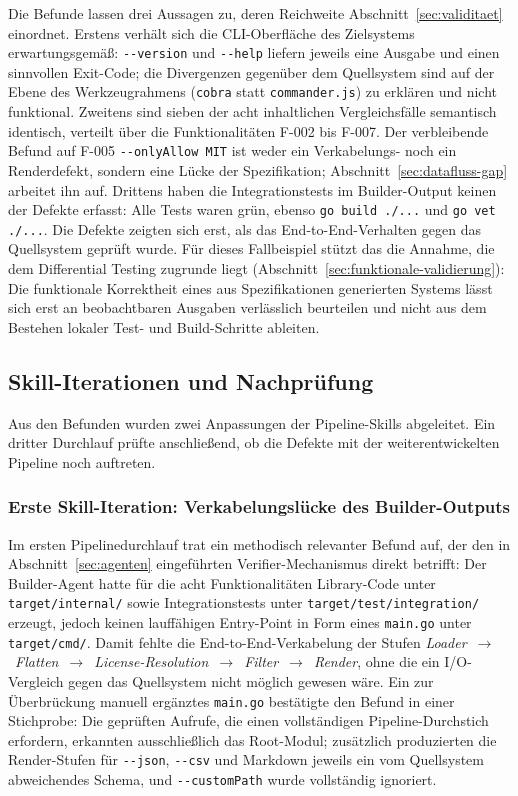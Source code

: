 Die Befunde lassen drei Aussagen zu, deren Reichweite Abschnitt~\ref{sec:validitaet} einordnet. Erstens verhält sich die CLI-Oberfläche des Zielsystems erwartungsgemäß: \texttt{-{}-version} und \texttt{-{}-help} liefern jeweils eine Ausgabe und einen sinnvollen Exit-Code; die Divergenzen gegenüber dem Quellsystem sind auf der Ebene des Werkzeugrahmens (\texttt{cobra} statt \texttt{commander.js}) zu erklären und nicht funktional. Zweitens sind sieben der acht inhaltlichen Vergleichsfälle semantisch identisch, verteilt über die Funktionalitäten F-002 bis F-007. Der verbleibende Befund auf F-005 \texttt{-{}-onlyAllow MIT} ist weder ein Verkabelungs- noch ein Renderdefekt, sondern eine Lücke der Spezifikation; Abschnitt~\ref{sec:datafluss-gap} arbeitet ihn auf. Drittens haben die Integrationstests im Builder-Output keinen der Defekte erfasst: Alle Tests waren grün, ebenso \texttt{go build ./...} und \texttt{go vet ./...}. Die Defekte zeigten sich erst, als das End-to-End-Verhalten gegen das Quellsystem geprüft wurde. Für dieses Fallbeispiel stützt das die Annahme, die dem Differential Testing zugrunde liegt (Abschnitt~\ref{sec:funktionale-validierung}): Die funktionale Korrektheit eines aus Spezifikationen generierten Systems lässt sich erst an beobachtbaren Ausgaben verlässlich beurteilen und nicht aus dem Bestehen lokaler Test- und Build-Schritte ableiten.

\subsection{Skill-Iterationen und Nachprüfung} \label{sec:iterationen}

Aus den Befunden wurden zwei Anpassungen der Pipeline-Skills abgeleitet. Ein dritter Durchlauf prüfte anschließend, ob die Defekte mit der weiterentwickelten Pipeline noch auftreten.

\subsubsection{Erste Skill-Iteration: Verkabelungslücke des Builder-Outputs} \label{sec:builder-gap}

Im ersten Pipelinedurchlauf trat ein methodisch relevanter Befund auf, der den in Abschnitt~\ref{sec:agenten} eingeführten Verifier-Mechanismus direkt betrifft: Der Builder-Agent hatte für die acht Funktionalitäten Library-Code unter \texttt{target/internal/} sowie Integrationstests unter \texttt{target/test/integration/} erzeugt, jedoch keinen lauffähigen Entry-Point in Form eines \texttt{main.go} unter \texttt{target/cmd/}. Damit fehlte die End-to-End-Verkabelung der Stufen \emph{Loader}~$\rightarrow$~\emph{Flatten}~$\rightarrow$~\emph{License-Resolution}~$\rightarrow$~\emph{Filter}~$\rightarrow$~\emph{Render}, ohne die ein I/O-Vergleich gegen das Quellsystem nicht möglich gewesen wäre. Ein zur Überbrückung manuell ergänztes \texttt{main.go} bestätigte den Befund in einer Stichprobe: Die geprüften Aufrufe, die einen vollständigen Pipeline-Durchstich erfordern, erkannten ausschließlich das Root-Modul; zusätzlich produzierten die Render-Stufen für \texttt{-{}-json}, \texttt{-{}-csv} und Markdown jeweils ein vom Quellsystem abweichendes Schema, und \texttt{-{}-customPath} wurde vollständig ignoriert.

